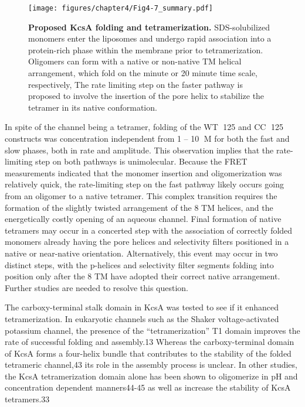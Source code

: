 \begin{figure}[!ht]
\begin{center}
	\texttt{[image: figures/chapter4/Fig4-7\_summary.pdf]}
\end{center}
	\caption{\textbf{Proposed KcsA folding and tetramerization.} SDS-solubilized monomers enter the liposomes and undergo rapid association into a protein-rich phase within the membrane prior to tetramerization. Oligomers can form with a native or non-native TM helical arrangement, which fold on the minute or 20 minute time scale, respectively, The rate limiting step on the faster pathway is proposed to involve the insertion of the pore helix to stabilize the tetramer in its native conformation.}
	\label{fig:ch4_f7}
\end{figure}

In spite of the channel being a tetramer, folding of the WT 125 and CC 125 constructs was concentration independent from 1 – 10 M for both the fast and slow phases, both in rate and amplitude. This observation implies that the rate-limiting step on both pathways is unimolecular. Because the FRET measurements indicated that the monomer insertion and oligomerization was relatively quick, the rate-limiting step on the fast pathway likely occurs going from an oligomer to a native tetramer. This complex transition requires the formation of the slightly twisted arrangement of the 8 TM helices, and the energetically costly opening of an aqueous channel. Final formation of native tetramers may occur in a concerted step with the association of correctly folded monomers already having the pore helices and selectivity filters positioned in a native or near-native orientation. Alternatively, this event may occur in two distinct steps, with the p-helices and selectivity filter segments folding into position only after the 8 TM have adopted their correct native arrangement. Further studies are needed to resolve this question.

The carboxy-terminal stalk domain in KcsA was tested to see if it enhanced tetramerization. In eukaryotic channels such as the Shaker voltage-activated potassium channel, the presence of the “tetramerization” T1 domain improves the rate of successful folding and assembly.13 Whereas the carboxy-terminal domain of KcsA forms a four-helix bundle that contributes to the stability of the folded tetrameric channel,43 its role in the assembly process is unclear. In other studies, the KcsA tetramerization domain alone has been shown to oligomerize in pH and concentration dependent manners44-45 as well as increase the stability of KcsA tetramers.33

